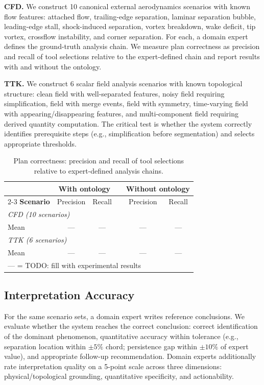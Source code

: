 \documentclass{vgtc}                          %
\begin{document}
\textbf{CFD.}
We construct 10 canonical external aerodynamics scenarios with known flow
features: attached flow, trailing-edge separation, laminar separation bubble,
leading-edge stall, shock-induced separation, vortex breakdown, wake deficit,
tip vortex, crossflow instability, and corner separation.
For each, a domain expert defines the ground-truth analysis chain.
We measure plan correctness as precision and recall of tool selections relative
to the expert-defined chain and report results with and without the ontology.

\textbf{TTK.}
We construct 6 scalar field analysis scenarios with known topological structure:
clean field with well-separated features, noisy field requiring simplification,
field with merge events, field with symmetry, time-varying field with
appearing/disappearing features, and multi-component field requiring derived
quantity computation.
The critical test is whether the system correctly identifies prerequisite steps
(e.g., simplification before segmentation) and selects appropriate thresholds.

\begin{table}[tb]
  \caption{Plan correctness: precision and recall of tool selections
  relative to expert-defined analysis chains.}
  \label{tab:plan_correctness}
  \centering
  \scriptsize
  \begin{tabular}{lccccc}
  \toprule
   & \multicolumn{2}{c}{\textbf{With ontology}} & & \multicolumn{2}{c}{\textbf{Without ontology}} \\
  \cmidrule{2-3} \cmidrule{5-6}
  \textbf{Scenario} & Precision & Recall & & Precision & Recall \\
  \midrule
  \multicolumn{6}{l}{\textit{CFD (10 scenarios)}} \\
  \quad Mean & --- & --- & & --- & --- \\
  \midrule
  \multicolumn{6}{l}{\textit{TTK (6 scenarios)}} \\
  \quad Mean & --- & --- & & --- & --- \\
  \bottomrule
  \multicolumn{6}{l}{\scriptsize --- = TODO: fill with experimental results} \\
  \end{tabular}
\end{table}

\subsection{Interpretation Accuracy}

For the same scenario sets, a domain expert writes reference conclusions.
We evaluate whether the system reaches the correct conclusion:
correct identification of the dominant phenomenon,
quantitative accuracy within tolerance (e.g., separation location within
$\pm 5\%$ chord; persistence gap within $\pm 10\%$ of expert value),
and appropriate follow-up recommendation.
Domain experts additionally rate interpretation quality on a 5-point scale
across three dimensions: physical/topological grounding, quantitative
specificity, and actionability.
\end{document}
